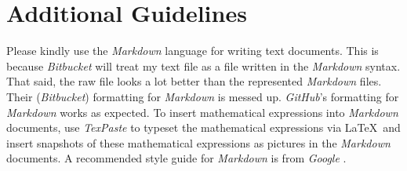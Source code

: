 \documentclass[letter,12pt]{article}
\begin{document}
\section{Additional Guidelines}
\label{sec:AdditionalGuidelines}

Please kindly use the {\it Markdown} language for writing text documents. This is because {\it Bitbucket} will treat my text file as a file written in the {\it Markdown} syntax. That said, the raw file looks a lot better than the represented {\it Markdown} files. Their ({\it Bitbucket}) formatting for {\it Markdown} is messed up. {\it GitHub}'s formatting for {\it Markdown} works as expected. To insert mathematical expressions into {\it Markdown} documents, use {\it TexPaste} \cite{Nguyen2013} to typeset the mathematical expressions via \LaTeX\ and insert snapshots of these mathematical expressions as pictures in the {\it Markdown} documents. A recommended style guide for {\it Markdown} is from {\it Google} \cite{Turakulov2018}. \\
\end{document}
